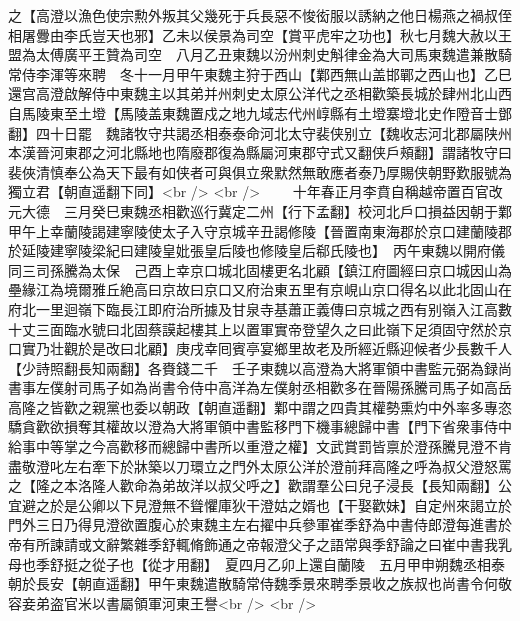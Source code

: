 之【高澄以漁色使宗勲外叛其父幾死于兵長惡不悛衒服以誘納之他日楊燕之禍叔侄相屠釁由李氏豈天也邪】乙未以侯景為司空【賞平虎牢之功也】秋七月魏大赦以王盟為太傅廣平王贊為司空　八月乙丑東魏以汾州刺史斛律金為大司馬東魏遣兼散騎常侍李渾等來聘　冬十一月甲午東魏主狩于西山【鄴西無山盖邯鄲之西山也】乙巳還宫高澄啟解侍中東魏主以其弟并州刺史太原公洋代之丞相歡築長城於肆州北山西自馬陵東至土墱【馬陵盖東魏置戍之地九域志代州崞縣有土墱寨墱北史作隥音士鄧翻】四十日罷　魏諸牧守共謁丞相泰泰命河北太守裴侠别立【魏收志河北郡屬陕州本漢晉河東郡之河北縣地也隋廢郡復為縣屬河東郡守式又翻侠戶頰翻】謂諸牧守曰裴俠清慎奉公為天下最有如侠者可與俱立衆默然無敢應者泰乃厚賜侠朝野歎服號為獨立君【朝直遥翻下同】<br />
<br />
　　十年春正月李賁自稱越帝置百官改元大德　三月癸巳東魏丞相歡巡行冀定二州【行下孟翻】校河北戶口損益因朝于鄴　甲午上幸蘭陵謁建寧陵使太子入守京城辛丑謁修陵【晉置南東海郡於京口建蘭陵郡於延陵建寧陵梁紀曰建陵皇妣張皇后陵也修陵皇后郗氏陵也】　丙午東魏以開府儀同三司孫騰為太保　己酉上幸京口城北固樓更名北顧【鎮江府圖經曰京口城因山為壘緣江為境爾雅丘絶高曰京故曰京口又府治東五里有京峴山京口得名以此北固山在府北一里迴嶺下臨長江即府治所據及甘泉寺基蕭正義傳曰京城之西有别嶺入江高數十丈三面臨水號曰北固蔡謨起樓其上以置軍實帝登望久之曰此嶺下足須固守然於京口實乃壮觀於是改曰北顧】庚戌幸囘賓亭宴鄉里故老及所經近縣迎候者少長數千人【少詩照翻長知兩翻】各賚錢二千　壬子東魏以高澄為大將軍領中書監元弼為録尚書事左僕射司馬子如為尚書令侍中高洋為左僕射丞相歡多在晉陽孫騰司馬子如高岳高隆之皆歡之親黨也委以朝政【朝直遥翻】鄴中謂之四貴其權勢熏灼中外率多專恣驕貪歡欲損奪其權故以澄為大將軍領中書監移門下機事總歸中書【門下省衆事侍中給事中等掌之今高歡移而總歸中書所以重澄之權】文武賞罰皆禀於澄孫騰見澄不肯盡敬澄叱左右牽下於牀築以刀環立之門外太原公洋於澄前拜高隆之呼為叔父澄怒罵之【隆之本洛隆人歡命為弟故洋以叔父呼之】歡謂羣公曰兒子浸長【長知兩翻】公宜避之於是公卿以下見澄無不聳懼庫狄干澄姑之婿也【干娶歡妹】自定州來謁立於門外三日乃得見澄欲置腹心於東魏主左右擢中兵參軍崔季舒為中書侍郎澄每進書於帝有所諫請或文辭繁雜季舒輒脩飾通之帝報澄父子之語常與季舒論之曰崔中書我乳母也季舒挺之從子也【從才用翻】　夏四月乙卯上還自蘭陵　五月甲申朔魏丞相泰朝於長安【朝直遥翻】甲午東魏遣散騎常侍魏季景來聘季景收之族叔也尚書令何敬容妾弟盗官米以書屬領軍河東王譽<br />
<br />
